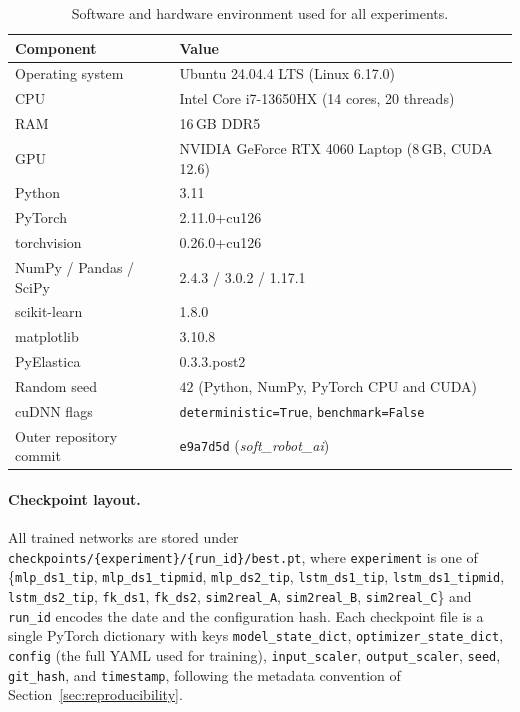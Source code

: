 \begin{table}[!htbp]
  \centering
  \small
  \caption{Software and hardware environment used for all experiments.}
  \label{tab:app_repro_env}
  \begin{tabularx}{\linewidth}{@{}l X@{}}
    \toprule
    Component & Value \\
    \midrule
    Operating system        & Ubuntu 24.04.4 LTS (Linux 6.17.0) \\
    CPU                     & Intel Core i7-13650HX (14 cores, 20 threads) \\
    RAM                     & 16\,GB DDR5 \\
    GPU                     & NVIDIA GeForce RTX 4060 Laptop (8\,GB, CUDA 12.6) \\
    Python                  & 3.11 \\
    PyTorch                 & 2.11.0+cu126 \\
    torchvision             & 0.26.0+cu126 \\
    NumPy / Pandas / SciPy  & 2.4.3 / 3.0.2 / 1.17.1 \\
    scikit-learn            & 1.8.0 \\
    matplotlib              & 3.10.8 \\
    PyElastica              & 0.3.3.post2 \\
    Random seed             & $42$ (Python, NumPy, PyTorch CPU and CUDA) \\
    cuDNN flags             & \texttt{deterministic=True}, \texttt{benchmark=False} \\
    Outer repository commit & \texttt{e9a7d5d} (\textit{soft\_robot\_ai}) \\
    \bottomrule
  \end{tabularx}
\end{table}

\paragraph{Checkpoint layout.}
All trained networks are stored under \texttt{checkpoints/\{experiment\}/\{run\_id\}/best.pt}, where \texttt{experiment} is one of \{\texttt{mlp\_ds1\_tip}, \texttt{mlp\_ds1\_tipmid}, \texttt{mlp\_ds2\_tip}, \texttt{lstm\_ds1\_tip}, \texttt{lstm\_ds1\_tipmid}, \texttt{lstm\_ds2\_tip}, \texttt{fk\_ds1}, \texttt{fk\_ds2}, \texttt{sim2real\_A}, \texttt{sim2real\_B}, \texttt{sim2real\_C}\} and \texttt{run\_id} encodes the date and the configuration hash. Each checkpoint file is a single PyTorch dictionary with keys \texttt{model\_state\_dict}, \texttt{optimizer\_state\_dict}, \texttt{config} (the full YAML used for training), \texttt{input\_scaler}, \texttt{output\_scaler}, \texttt{seed}, \texttt{git\_hash}, and \texttt{timestamp}, following the metadata convention of Section~\ref{sec:reproducibility}.

